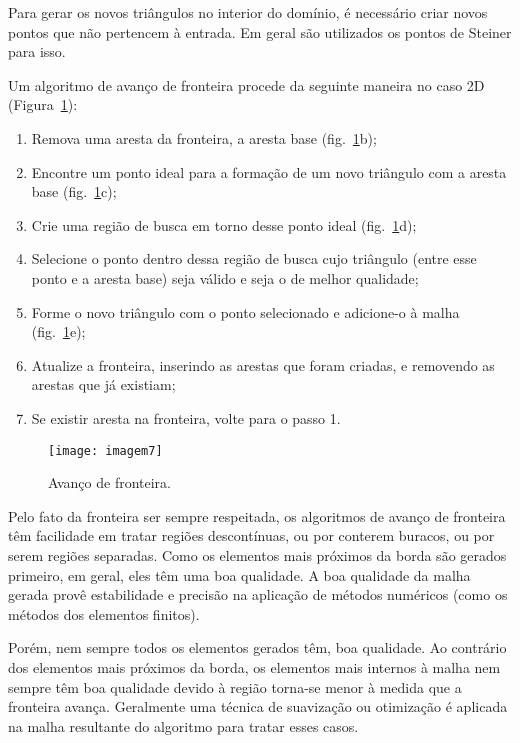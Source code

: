 Para gerar os novos triângulos no interior do domínio, é necessário criar novos pontos que não pertencem à entrada. Em geral são utilizados os pontos de Steiner para isso.

Um algoritmo de avanço de fronteira procede da seguinte maneira no caso 2D (Figura~\ref{fig:imagem7}):
 
 \begin{enumerate}
\item{ Remova uma aresta da fronteira, a aresta base (fig.~\ref{fig:imagem7}b);}
\item{ Encontre um ponto ideal para a formação de um novo triângulo com a aresta base (fig.~\ref{fig:imagem7}c);}
\item{ Crie uma região de busca em torno desse ponto ideal (fig.~\ref{fig:imagem7}d);}
\item{ Selecione o ponto dentro dessa região de busca cujo triângulo (entre esse ponto e a aresta base) seja válido e seja o de melhor qualidade;}
\item{ Forme o novo triângulo com o ponto selecionado e adicione-o à malha (fig.~\ref{fig:imagem7}e);}
\item{ Atualize a fronteira, inserindo as arestas que foram criadas, e removendo as arestas que já existiam;}
\item{ Se existir aresta na fronteira, volte para o passo 1.}
\end{enumerate}

 \begin{figure}[htbp]
     \centering
     \texttt{[image: imagem7]}
     \caption{Avanço de fronteira. \cite{bib:Freitas10}} 
     \label{fig:imagem7}
 \end{figure}

 Pelo fato da fronteira ser sempre respeitada, os algoritmos de avanço de fronteira têm facilidade em tratar regiões descontínuas, ou por conterem buracos, ou por serem regiões separadas. Como os elementos mais próximos da borda são gerados primeiro, em geral, eles têm uma boa qualidade. A boa qualidade da malha gerada provê estabilidade e precisão na aplicação de métodos numéricos (como os métodos dos elementos finitos).

Porém, nem sempre todos os elementos gerados têm, boa qualidade. Ao contrário dos elementos mais próximos da borda, os elementos mais internos à malha nem sempre têm boa qualidade devido à região torna-se menor à medida que a fronteira avança. Geralmente uma técnica de suavização ou otimização é aplicada na malha resultante do algoritmo para tratar esses casos.

